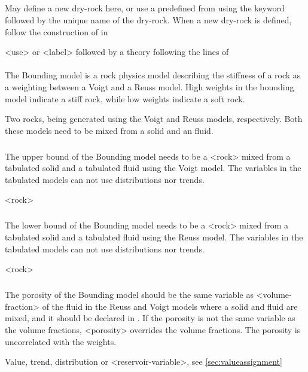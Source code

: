 {\subparagraph{}
 \slist
   \item \Description  May define a new dry-rock here, or use a predefined  from  using the keyword  followed by the unique name of the dry-rock. When a new dry-rock is defined, follow the construction of  in 
   \item \Argument <use> or <label> followed by a theory following the lines of 
   \item \Default
 \elist

\paragraph{}
 \slist
   \item \Description The Bounding model is a rock physics model describing the stiffness of a rock as a weighting between a Voigt and a Reuss model. High weights in the bounding model indicate a stiff rock, while low weights indicate a soft rock.
   \item \Argument Two rocks, being generated using the Voigt and Reuss models, respectively. Both these models need to be mixed from a solid and an fluid. 
   \item \Default 
 \elist

\subparagraph{}
 \slist
   \item \Description The upper bound of the Bounding model needs to be a <rock> mixed from a tabulated solid and a tabulated fluid using the Voigt model. The variables in the tabulated models can not use distributions nor trends.
   \item \Argument <rock>
   \item \Default
 \elist

\subparagraph{}
 \slist
   \item \Description The lower bound of the Bounding model needs to be a <rock> mixed from a tabulated solid and a tabulated fluid using the Reuss model. The variables in the tabulated models can not use distributions nor trends.
   \item \Argument <rock>
   \item \Default
 \elist

\subparagraph{}
 \slist
   \item \Description The porosity of the Bounding model should be the same variable as <volume-fraction> of the fluid in the Reuss and Voigt models where a solid and fluid are mixed, and it should be declared in . If the porosity is not the same variable as the volume fractions, <porosity> overrides the volume fractions. The porosity is uncorrelated with the weights.
   \item \Argument Value, trend, distribution or <reservoir-variable>, see \autoref{sec:valueassignment}
   \item \Default
 \elist

}
